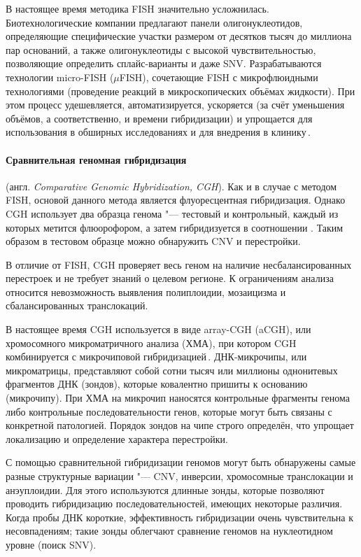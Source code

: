 \documentclass[a4paper,14pt]{extarticle}
\newcommand{\ecitep}[1]{\textenglish{\citep{#1}}}
\newcommand{\engterm}[1]{англ. \textenglish{\textit{#1}}}
\begin{document}
В настоящее время методика FISH значительно усложнилась.
Биотехнологические компании предлагают панели олигонуклеотидов, определяющие специфические участки размером от десятков тысяч до миллиона пар оснований, а также олигонуклеотиды с высокой чувствительностью, позволяющие определить сплайс-варианты и даже SNV.
Разрабатываются технологии micro-FISH ($\mu$FISH), сочетающие FISH с микрофлюидными технологиями (проведение реакций в микроскопических объёмах жидкости).
При этом процесс удешевляется, автоматизируется, ускоряется (за счёт уменьшения объёмов, а соответственно, и времени гибридизации) и упрощается для использования в обширных исследованиях и для внедрения в клинику\,\ecitep{Huber_2018}.

\paragraph{Сравнительная геномная гибридизация} (\engterm{Comparative Genomic Hybridization, CGH}).
Как и в случае с методом FISH, основой данного метода является флуоресцентная гибридизация.
Однако CGH использует два образца генома "--- тестовый и контрольный, каждый из которых метится флюорофором, а затем гибридизуется в соотношении .
Таким образом в тестовом образце можно обнаружить CNV и перестройки.

В отличие от FISH, CGH проверяет весь геном на наличие несбалансированных перестроек и не требует знаний о целевом регионе.
К ограничениям анализа относится невозможность выявления полиплоидии, мозаицизма и сбалансированных транслокаций.

В настоящее время CGH используется в виде array-CGH (aCGH), или хромосомного микроматричного анализа (ХМА), при котором CGH комбинируется с микрочиповой гибридизацией\,\ecitep{Theisen_2008}.
ДНК-микрочипы, или микроматрицы, представляют собой сотни тысяч или миллионы однонитевых фрагментов ДНК (зондов), которые ковалентно пришиты к основанию (микрочипу).
При ХМА на микрочип наносятся контрольные фрагменты генома либо контрольные последовательности генов, которые могут быть связаны с конкретной патологией.
Порядок зондов на чипе строго определён, что упрощает локализацию и определение характера перестройки.

С помощью сравнительной гибридизации геномов могут быть обнаружены самые разные структурные вариации "--- CNV, инверсии, хромосомные транслокации и анэуплоидии.
Для этого используются длинные зонды, которые позволяют проводить гибридизацию последовательностей, имеющих некоторые различия.
Когда пробы ДНК короткие, эффективность гибридизации очень чувствительна к несовпадениям; такие зонды облегчают сравнение геномов на нуклеотидном уровне (поиск SNV).
\end{document}
